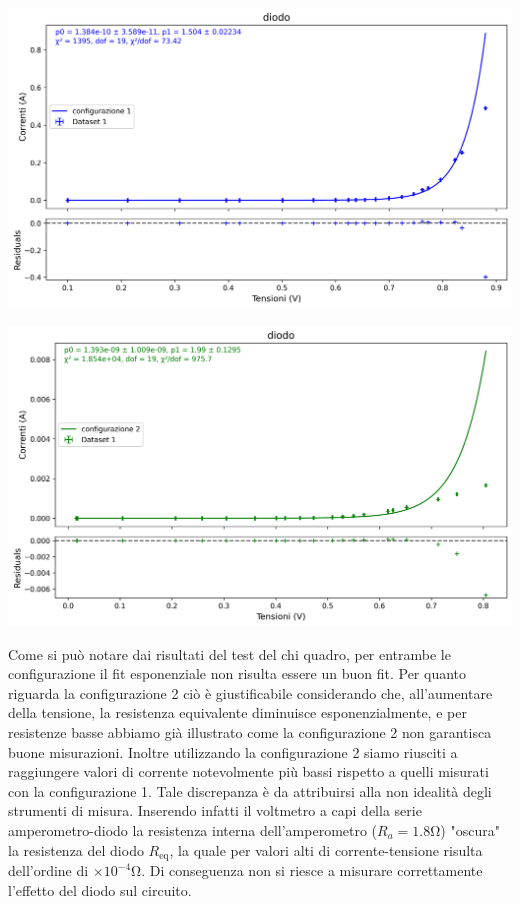 \documentclass[a4paper]{article}
\begin{document}
\begin{center}
    \includegraphics[width=0.75\linewidth]{grafici/diodo_1.png}
    \label{fig:diodo 1}
\end{center}
\begin{center}
    \centering
    \includegraphics[width=0.75\linewidth]{grafici/diodo_2.png}
    \label{fig:diodo 2}
\end{center}
Come si può notare dai risultati del test del chi quadro, per entrambe le configurazione il fit esponenziale non risulta essere un buon fit.
Per quanto riguarda la configurazione 2 ciò è giustificabile considerando che,          all'aumentare della tensione, la resistenza equivalente diminuisce esponenzialmente, e per resistenze basse abbiamo già illustrato come la configurazione 2 non garantisca buone misurazioni. 
Inoltre utilizzando la configurazione 2 siamo riusciti a raggiungere valori di corrente notevolmente più bassi rispetto a quelli misurati con la configurazione 1. Tale discrepanza è da attribuirsi alla non idealità degli strumenti di misura. Inserendo infatti il voltmetro a capi della serie amperometro-diodo la resistenza interna dell'amperometro ($R_a=1.8 \si{\ohm}$) "oscura" la resistenza del diodo $R_{\text{eq}}$, la quale per valori alti di corrente-tensione risulta dell'ordine di $\times 10^{-4}\si{\ohm}$. Di conseguenza non si riesce a misurare correttamente l'effetto del diodo sul circuito.
\end{document}
